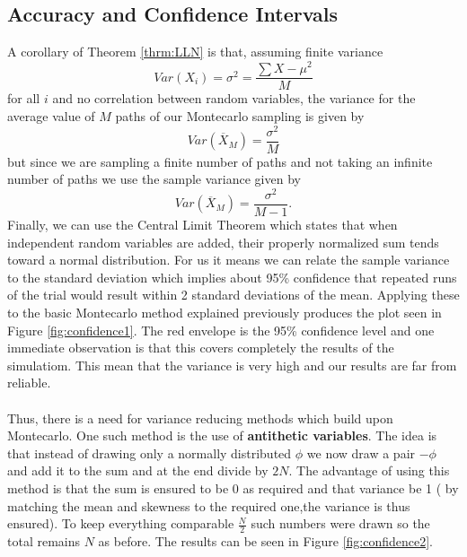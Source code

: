 \documentclass{article}
\begin{document}
\subsection*{Accuracy and Confidence Intervals}
A corollary of Theorem \ref{thrm:LLN} is that, assuming finite variance
\begin{equation}
  {Var} (X_{i})=\sigma ^{2} = \frac{\sum{X-\mu}^2}{M}
  \label{eq:oneVariance}
\end{equation}
for all $i$ and no correlation between random variables, the variance for the average value of $M$ paths of our Montecarlo sampling is given by
\begin{equation}
  Var(\overline {X}_{M}) = \frac {\sigma ^{2}}{M}
  \label{eq:variance}
\end{equation}
but since we are sampling a finite number of paths and not taking an infinite number of paths we use the sample variance given by
\begin{equation}
  Var(\overline {X}_{M}) = \frac {\sigma ^{2}}{M-1}.
  \label{eq:sampleVariance}
\end{equation}
Finally, we can use the Central Limit Theorem which states that when independent random variables are added, their properly normalized sum tends toward a normal distribution. For us it means we can relate the sample variance to the standard deviation which implies about 95\% confidence that repeated runs of the trial would result within 2 standard deviations of the mean. Applying these to the basic Montecarlo method explained previously produces the plot seen in Figure \ref{fig:confidence1}. The red envelope is the 95\% confidence level and one immediate observation is that this covers completely the results of the simulatiom. This mean that the variance is very high and our results are far from reliable.
\\
\\
Thus, there is a need for variance reducing methods which build upon Montecarlo. One such method is the use of \textbf{antithetic variables}. The idea is that instead of drawing only a normally distributed $\phi$ we now draw a pair $-\phi$ and add it to the sum and at the end divide by $2N$. The advantage of using this method is that the sum is ensured to be 0 as required and that variance be 1 ( by matching the mean and skewness to the required one,the variance is thus ensured). To keep everything comparable $\frac{N}{2}$ such numbers were drawn so the total remains $N$ as before. The results can be seen in Figure \ref{fig:confidence2}.
\\
\end{document}
